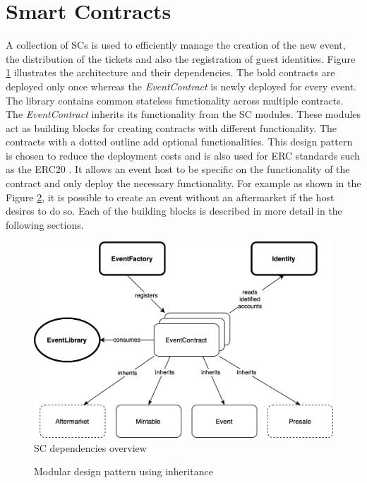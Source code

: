 \section{Smart Contracts}

A collection of SCs is used to efficiently manage the creation of the new event, the distribution of the tickets and also the registration of guest identities. Figure \ref{fig:smart-contract-overview} illustrates the architecture and their dependencies. The bold contracts are deployed only once whereas the \textit{EventContract} is newly deployed for every event. The library contains common stateless functionality across multiple contracts. The \textit{EventContract} inherits its functionality from the SC modules. These modules act as building blocks for creating contracts with different functionality. The contracts with a dotted outline add optional functionalities. This design pattern is chosen to reduce the deployment costs and is also used for ERC standards such as the ERC20 \cite{solidity-inheritance}. It allows an event host to be specific on the functionality of the contract and only deploy the necessary functionality. For example as shown in the Figure \ref{code:smart-contract-inheritance}, it is possible to create an event without an aftermarket if the host desires to do so. Each of the building blocks is described in more detail in the following sections.

\begin{figure}[hbt]
    \centering
    \includegraphics[width=14cm]{figures/smart-contract-overview-4.png}
    \caption{SC dependencies overview}
    \label{fig:smart-contract-overview}
\end{figure}

\begin{figure}[hbt]
    
    \caption{Modular design pattern using inheritance}
    \label{code:smart-contract-inheritance}
\end{figure}


